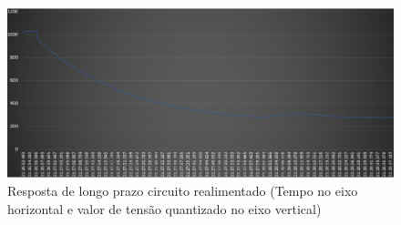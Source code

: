 \begin{figure}[h!]
	\begin{center}
		\includegraphics[width=1\linewidth]{images/DecaimentoRespiracaoMascara.png}
		\caption{Resposta de longo prazo circuito realimentado (Tempo no eixo horizontal e valor de tensão quantizado no eixo vertical)}
		\label{fig:RespostaCircuitoRealimentadoLongoPrazo}
	\end{center}
\end{figure}


 
 